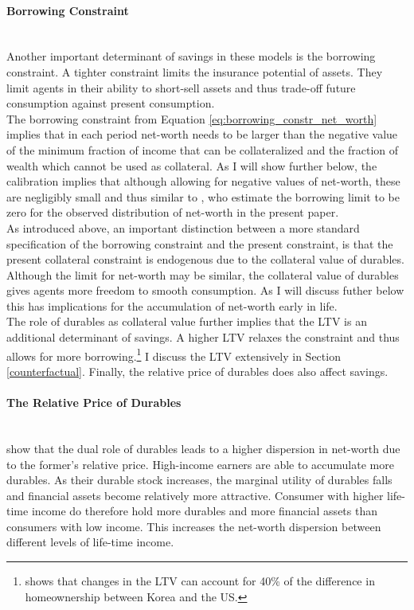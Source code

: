 \documentclass[a4paper,12pt,legno]{article}
\newcommand{\myparagraph}[1]{\paragraph{#1}\mbox{}\\}
\begin{document}
\myparagraph{Borrowing Constraint} Another important determinant of savings in these models is the borrowing constraint. A tighter constraint limits the insurance potential of assets. They limit agents in their ability to short-sell assets and thus trade-off future consumption against present consumption. \\ 
The borrowing constraint from Equation \ref{eq:borrowing_constr_net_worth} implies that in each period net-worth needs to be larger than the negative value of the minimum fraction of income that can be collateralized and the fraction of wealth which cannot be used as collateral. As I will show further below, the calibration implies that although allowing for negative values of net-worth, these are negligibly small and thus similar to \cite{hintermaier2011}, who estimate the borrowing limit to be zero for the observed distribution of net-worth in the present paper. 
\\ 
As introduced above, an important distinction between a more standard specification of the borrowing constraint and the present constraint, is that the present collateral constraint is endogenous due to the collateral value of durables. Although the limit for net-worth may be similar, the collateral value of durables gives agents more freedom to smooth consumption. As I will discuss futher below this has implications for the accumulation of net-worth early in life.\\ The role of durables as collateral value further implies that the LTV is an additional determinant of savings. A higher LTV relaxes the constraint and thus allows for more borrowing.\footnote{\cite{cho2012accounting} shows that changes in the LTV can account for 40\% of the difference in homeownership between Korea and the US.} I discuss the LTV extensively in Section \ref{counterfactual}.
Finally, the relative price of durables does also affect savings.

\myparagraph{The Relative Price of Durables} \cite{FV&K2011} show that the dual role of durables leads to a higher dispersion in net-worth due to the former's relative price. High-income earners are able to accumulate more durables. As their durable stock increases, the marginal utility of durables falls and financial assets become relatively more attractive. Consumer with higher life-time income do therefore hold more durables and more financial assets than consumers with low income. This increases the net-worth dispersion between different levels of life-time income. 
\end{document}
